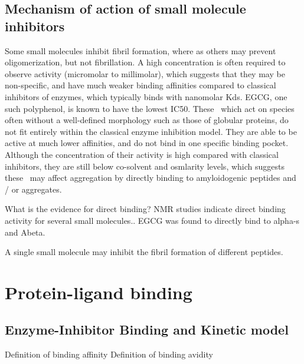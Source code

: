 \subsection{Mechanism of action of small molecule inhibitors}
Some small molecules inhibit fibril formation, where as others may prevent oligomerization, but not fibrillation. A high concentration is often required to observe activity (micromolar to millimolar), which suggests that they may be non-specific, and have much weaker binding affinities compared to classical inhibitors of enzymes, which typically binds with nanomolar Kds. EGCG, one such polyphenol, is known to have the lowest IC50.  These \smi\ which act on species often without a well-defined morphology such as those of globular proteins, do not fit entirely within the classical enzyme inhibition model. They are able to be active at much lower affinities, and do not bind in one specific binding pocket.  Although the concentration of their activity is high compared with classical inhibitors,  they are still below co-solvent and osmlarity levels, which suggests these \smi\ may affect aggregation by directly binding to amyloidogenic peptides and / or aggregates.

What is the evidence for direct binding? NMR studies indicate direct binding activity for several small molecules.\cite{XXX EGCG paper nature 2007}.  EGCG was found to directly bind to alpha-s and Abeta.

A single small molecule may inhibit the fibril formation of different peptides.


\section{Protein-ligand binding}

\subsection{Enzyme-Inhibitor Binding and Kinetic model}
Definition of binding affinity
Definition of binding avidity

